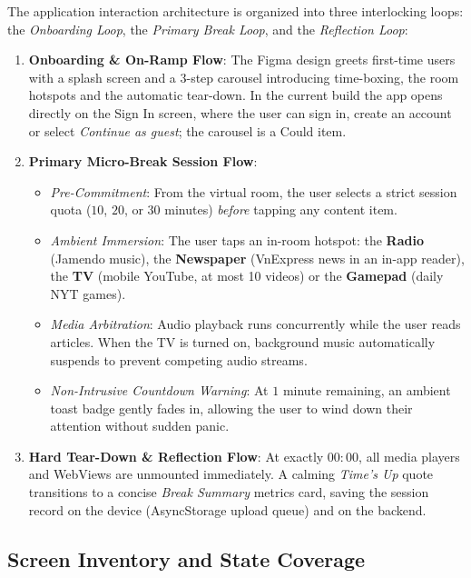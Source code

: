 The application interaction architecture is organized into three interlocking loops: the \textit{Onboarding Loop}, the \textit{Primary Break Loop}, and the \textit{Reflection Loop}:
\begin{enumerate}[leftmargin=1.5em, itemsep=3pt]
  \item \textbf{Onboarding \& On-Ramp Flow}: The Figma design greets first-time users with a splash screen and a 3-step carousel introducing time-boxing, the room hotspots and the automatic tear-down. In the current build the app opens directly on the Sign In screen, where the user can sign in, create an account or select \textit{Continue as guest}; the carousel is a Could item.
  \item \textbf{Primary Micro-Break Session Flow}:
    \begin{itemize}[leftmargin=1.2em, itemsep=1pt]
      \item \textit{Pre-Commitment}: From the virtual room, the user selects a strict session quota ($10$, $20$, or $30$ minutes) \textit{before} tapping any content item.
      \item \textit{Ambient Immersion}: The user taps an in-room hotspot: the \textbf{Radio} (Jamendo music), the \textbf{Newspaper} (VnExpress news in an in-app reader), the \textbf{TV} (mobile YouTube, at most 10 videos) or the \textbf{Gamepad} (daily NYT games).
      \item \textit{Media Arbitration}: Audio playback runs concurrently while the user reads articles. When the TV is turned on, background music automatically suspends to prevent competing audio streams.
      \item \textit{Non-Intrusive Countdown Warning}: At $1$ minute remaining, an ambient toast badge gently fades in, allowing the user to wind down their attention without sudden panic.
    \end{itemize}
  \item \textbf{Hard Tear-Down \& Reflection Flow}: At exactly $00:00$, all media players and WebViews are unmounted immediately. A calming \textit{Time's Up} quote transitions to a concise \textit{Break Summary} metrics card, saving the session record on the device (AsyncStorage upload queue) and on the backend.
\end{enumerate}

\subsection{Screen Inventory and State Coverage}
\label{sec:screen-inventory}

